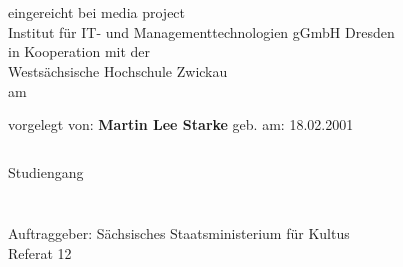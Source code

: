 \thispagestyle{empty}




\begin{center}
    \vspace*{2.5cm}
    \doublespacing
    \textbf{\LARGE{\titleDocument}}\\
    \vspace{0.5cm}
    \normalsize{\Thema}\\
\end{center}

\begin{center}
    \vspace{1cm}
    \doublespacing
    \normalsize{eingereicht bei media project}\\
    \normalsize{Institut für IT- und Managementtechnologien gGmbH Dresden}\\
    \normalsize{in Kooperation mit der}\\
    \normalsize{Westsächsische Hochschule Zwickau}\\
    \normalsize{am \Abgabedatum}
\end{center}

\begin{center}
    \vspace{1cm}
    \doublespacing
    vorgelegt von: \textbf{Martin Lee Starke} geb. am: 18.02.2001
    \singlespacing
    \begin{verbatim}
\end{verbatim}
    \normalsize{Studiengang \Studiengang}
\end{center}
\begin{verbatim}

\end{verbatim}
\begin{center}

\end{center}
\begin{verbatim}

\end{verbatim}
\begin{center}
    Auftraggeber: Sächsisches Staatsministerium für Kultus\\Referat 12
\end{center}
\begin{verbatim}
\end{verbatim}
